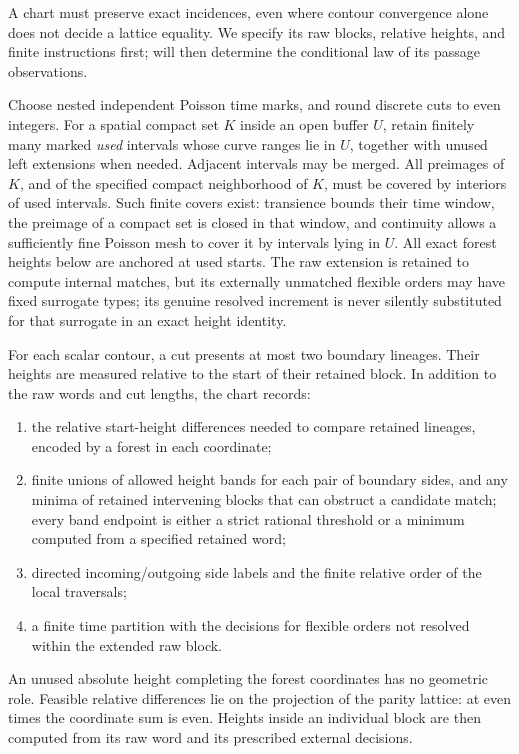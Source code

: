 A chart must preserve exact incidences, even where contour convergence alone does not decide a lattice equality. We specify its raw blocks, relative heights, and finite instructions first;  will then determine the conditional law of its passage observations.

Choose nested independent Poisson time marks, and round discrete cuts to even integers. For a spatial compact set \(K\) inside an open buffer \(U\), retain finitely many marked \emph{used} intervals whose curve ranges lie in \(U\), together with unused left extensions when needed. Adjacent intervals may be merged. All preimages of \(K\), and of the specified compact neighborhood of \(K\), must be covered by interiors of used intervals. Such finite covers exist: transience bounds their time window, the preimage of a compact set is closed in that window, and continuity allows a sufficiently fine Poisson mesh to cover it by intervals lying in \(U\). All exact forest heights below are anchored at used starts. The raw extension is retained to compute internal matches, but its externally unmatched flexible orders may have fixed surrogate types; its genuine resolved increment is never silently substituted for that surrogate in an exact height identity.

For each scalar contour, a cut presents at most two boundary lineages. Their heights are measured relative to the start of their retained block. In addition to the raw words and cut lengths, the chart records:
\begin{enumerate}[label=(\alph*)]
\item the relative start-height differences needed to compare retained lineages, encoded by a forest in each coordinate;
\item finite unions of allowed height bands for each pair of boundary sides, and any minima of retained intervening blocks that can obstruct a candidate match; every band endpoint is either a strict rational threshold or a minimum computed from a specified retained word;
\item directed incoming/outgoing side labels and the finite relative order of the local traversals;
\item a finite time partition with the decisions for flexible orders not resolved within the extended raw block.
\end{enumerate}
An unused absolute height completing the forest coordinates has no geometric role. Feasible relative differences lie on the projection of the parity lattice: at even times the coordinate sum is even. Heights inside an individual block are then computed from its raw word and its prescribed external decisions.

